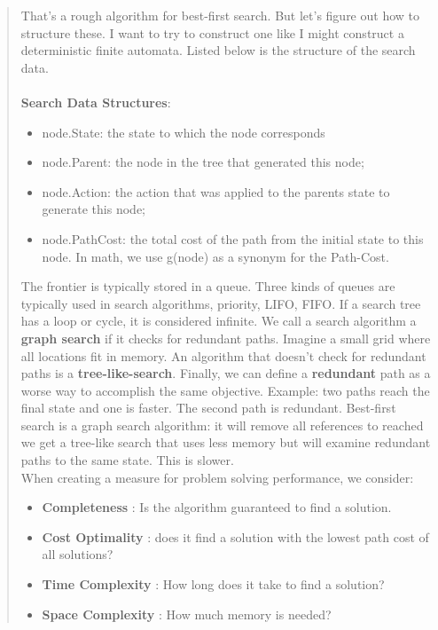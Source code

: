\documentclass{article}
\begin{document}
\begin{quote}
    That's a rough algorithm for best-first search. But let's figure out how to structure these. I want to try to construct one like I might construct a deterministic finite automata. Listed below is the
    structure of the search data. \\
    \\ \textbf{Search Data Structures}:
    \begin{itemize}
        \item node.State: the state to which the node corresponds
        \item node.Parent: the node in the tree that generated this node;
        \item node.Action: the action that was applied to the parents state to generate this node;
        \item node.PathCost: the total cost of the path from the initial state to this node. In math, we use g(node) as a synonym for the Path-Cost.
    \end{itemize}
    The frontier is typically stored in a queue. Three kinds of queues are typically used in search algorithms, priority, LIFO, FIFO. If a search tree has a loop or cycle, it is considered infinite. We call
    a search algorithm a \textbf{graph search} if it checks for redundant paths. Imagine a small grid where all locations fit in memory. An algorithm that doesn't
    check for redundant paths is a \textbf{tree-like-search}. Finally, we can define a \textbf{redundant} path as a worse way to accomplish the same objective. Example: two paths reach the
    final state and one is faster. The second path is redundant. Best-first search is a graph search algorithm: it will remove all references to reached we get a tree-like search that uses less memory but will
    examine redundant paths to the same state. This is slower.
    \\ When creating a measure for problem solving performance, we consider: \\
    \begin{itemize}
        \item \textbf{Completeness} : Is the algorithm guaranteed to find a solution.
        \item  \textbf{Cost Optimality} : does it find a solution with the lowest path cost of all solutions?
        \item \textbf{Time Complexity} : How long does it take to find a solution?
        \item  \textbf{Space Complexity} : How much memory is needed?
    \end{itemize}
\end{quote}
\end{document}
